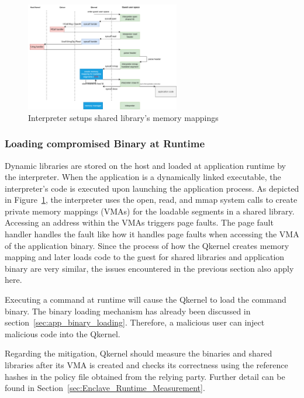 \begin{figure}[htp]
  \centering
  \includegraphics[width=0.6\textwidth]{images/load_shared_libarart.png}
  \caption[Interpreter setups shared library's memory mappings]{Interpreter setups shared library's memory mappings}
  \label{fig:load_shared_libarart}
\end{figure}


\subsubsection{Loading compromised Binary at Runtime}
Dynamic libraries are stored on the host and loaded at application runtime by the interpreter. When the application is a dynamically linked executable, the interpreter's code is executed upon launching the application process. As depicted in Figure~\ref{fig:load_shared_libarart}, the interpreter uses the open, read, and mmap 
system calls to create private memory mappings (VMAs) for the loadable segments in a shared library. Accessing an address within the VMAs triggers page faults. The page fault handler handles the fault like how it handles page faults when accessing the VMA of the application binary.
Since the process of how the Qkernel creates memory mapping and later loads code to the guest for shared libraries and application binary are very similar, the issues encountered in the previous section also apply here. 
 
Executing a command at runtime will cause the Qkernel to load the command binary. The binary loading mechanism has already been discussed in section~\ref{sec:app_binary_loading}. Therefore, a malicious user can inject malicious code into the Qkernel. 
 
Regarding the mitigation, Qkernel should measure the binaries and shared libraries after its VMA is created and checks its correctness using the reference hashes in the policy file obtained from the relying party. Further detail can be found in Section~\ref{sec:Enclave_Runtime_Measurement}. 


